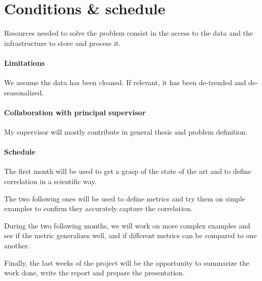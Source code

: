 \documentclass[12pt,a4paper]{article}
\begin{document}
\section*{Conditions \& schedule}

Resources needed to solve the problem consist in the access to the data and the infrastructure to store and process it.


\paragraph*{Limitations}

We assume the data has been cleaned. If relevant, it has been de-trended and de-seasonalized.

\paragraph*{Collaboration with principal supervisor}

My supervisor will mostly contribute in general thesis and problem definition.

\paragraph*{Schedule}

The first month will be used to get a grasp of the state of the art and to define correlation in a scientific way.

The two following ones will be used to define metrics and try them on simple examples to confirm they accurately capture the correlation.

During the two following months, we will work on more complex examples and see if the metric generalizes well, and if different metrics can be compared to one another.

Finally, the last weeks of the project will be the opportunity to summarize the work done, write the report and prepare the presentation.

\pagebreak

\end{document}
